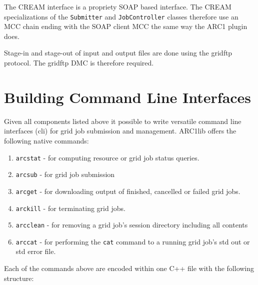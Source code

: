 \documentclass{book}
\newcommand{\Submitter}{\texttt{Submitter}}
\newcommand{\JobController}{\texttt{JobController}}
\begin{document}
The CREAM interface is a propriety SOAP based interface. The CREAM
specializations of the {\Submitter} and {\JobController} classes
therefore use an MCC chain ending with the SOAP client MCC the same 
way the ARC1 plugin does.

Stage-in and stage-out of input and output files are done using the
gridftp protocol. The gridftp DMC is therefore required.

\chapter{Building Command Line Interfaces}
\label{sec:cli}
Given all components listed above it possible to write versatile command line interfaces (cli) for 
grid job submission and management. ARC1lib offers the following native commands:

\begin{enumerate}
\item{\texttt{arcstat} - for computing resource or grid job status queries.}
\item{\texttt{arcsub} - for grid job submission}
\item{\texttt{arcget} - for downloading output of finished, cancelled or failed grid jobs.}
\item{\texttt{arckill} - for terminating grid jobs.}
\item{\texttt{arcclean} - for removing a grid job's session directory including all contents}
\item{\texttt{arccat} - for performing the \texttt{cat} command to a running grid job's std out or std error file.}
\end{enumerate}

Each of the commands above are encoded within one C++ file with the following structure:
\end{document}
